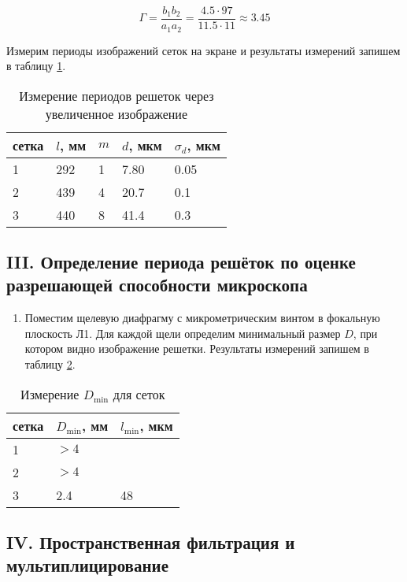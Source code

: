 \documentclass[a4paper,12pt]{article}
\begin{document}
\begin{equation*}
    \Gamma = \frac{b_1 b_2}{a_1 a_2} = \frac{4.5 \cdot 97}{11.5 \cdot 11} \approx 3.45
\end{equation*}

Измерим периоды изображений сеток на экране и результаты измерений запишем в таблицу \ref{table:2}.

\begin{table}[!ht]
    \centering
    \caption{Измерение периодов решеток через увеличенное изображение}
    \begin{tabular}{|l|l|l|l|l|}
        \hline
        сетка & $l$, мм & $m$ & $d$, мкм & $\sigma_d$, мкм \\ \hline
        1 & 292 & 1 & 7.80 & 0.05 \\ \hline
        2 & 439 & 4 & 20.7 & 0.1 \\ \hline
        3 & 440 & 8 & 41.4 & 0.3 \\ \hline
    \end{tabular}
    \label{table:2}
\end{table}

\subsection*{III. Определение периода решёток по оценке разрешающей способности микроскопа}

\begin{enumerate}[resume]
    \item Поместим щелевую диафрагму с микрометрическим винтом в фокальную плоскость Л1. Для каждой щели определим минимальный размер $D$, при котором видно изображение решетки. Результаты измерений запишем в таблицу \ref{table:3}.
\end{enumerate}

\begin{table}[!ht]
    \centering
    \caption{Измерение $D_{\min}$ для сеток}
    \begin{tabular}{|l|l|l|}
        \hline
        сетка & $D_{\min}$, мм & $l_{\min}$, мкм  \\ \hline
        1 & $>4$ & ~  \\ \hline
        2 & $>4$ & ~  \\ \hline
        3 & 2.4 & 48  \\ \hline
    \end{tabular}
    \label{table:3}
\end{table}

\subsection*{IV. Пространственная фильтрация и мультиплицирование}
\end{document}
